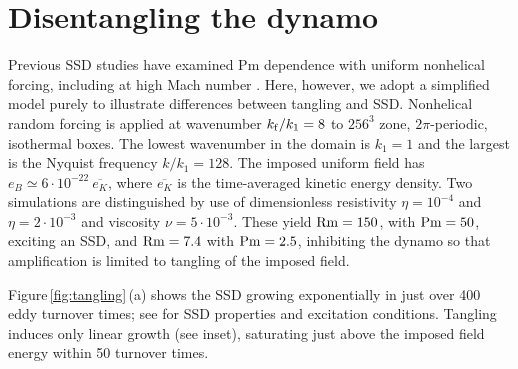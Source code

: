 \documentclass[preprint2]{aastex63}
\newcommand\Rm{{\rm Rm} }
\newcommand\Pm{{\rm Pm} }
\newcommand\kf{k_{\rm f} }
\newcommand{\fg}[1]{\textcolor{midgreen}{#1}}
\newcommand{\mm}[1]{\textcolor{mypurple}{#1}}
\begin{document}
\section{Disentangling the dynamo} \label{sec:ssd-tang}

 \fg{Previous SSD studies have examined Pm dependence with \mm{uniform}
 nonhelical forcing, including \mm{at} high Mach number \citep[e.g.,][]{ 
 HBD03,HBD04,Haugen:2004M,FCSBKS11,FSBS14}.}
 \fg{Here, however, we adopt a simplified model purely t}o illustrate
 differences between tangling and SSD.
 Nonhelical random forcing is applied at wavenumber $\kf/k_1=8$ to
 $256^3$ zone, $2\pi$-periodic, isothermal boxes.
 The lowest wavenumber in the domain is $k_1=1$ and the largest is the Nyquist
 frequency $k/k_1 = 128$.
 The imposed uniform field has $e_B\simeq6\cdot10^{-22}~\overline{e_K}$, where
 $\overline{e_K}$ is the time-averaged kinetic energy density.
 Two simulations are distinguished by use of dimensionless
 resistivity $\eta=10^{-4}$
 and $\eta=2\cdot10^{-3}$ and viscosity $\nu=5\cdot10^{-3}$.
 These yield $\Rm=150$, with $\Pm = 50$, exciting \mm{an} SSD, and $\Rm=7.4$ with
 $\Pm=2.5$, inhibiting the dynamo so that amplification is limited to tangling
 of the imposed field.

 Figure\,\ref{fig:tangling}\,(a) shows the SSD growing exponentially in just over
 400 eddy turnover times; see \cite{ZRS83} for SSD properties and excitation
 conditions.
 Tangling induces only linear growth (see inset), saturating just above
 the imposed field energy within 50 turnover times.
\end{document}
